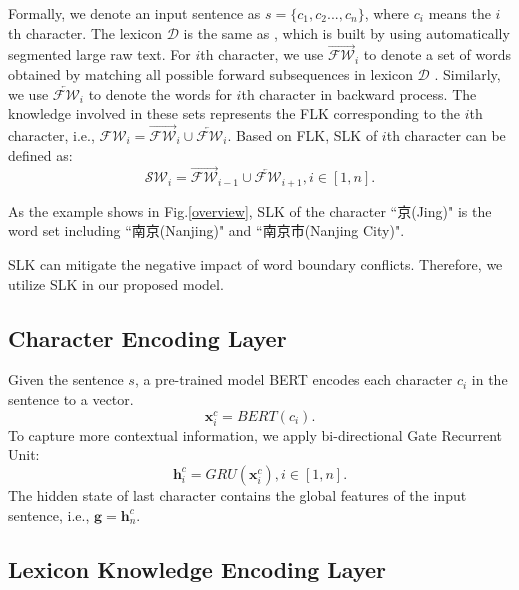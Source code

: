 \documentclass[conference]{IEEEtran}
\begin{document}
Formally, we denote an input sentence as $s = \{ c_{1}, c_{2}..., c_{n} \}$,
where $c_i$ means the $i$th character. The lexicon $\mathcal{D}$ is the same as \cite{zhang2018chinese}, which is built by 
using automatically segmented large raw text.
For $i$th character, we use $\overrightarrow{\mathcal{FW}}_i$ to denote a set of words obtained by 
matching all possible forward subsequences in lexicon $\mathcal{D}$ \cite{liu2019encoding}.  Similarly, we use ${\overleftarrow{\mathcal{FW}}_i}$ to denote the words 
for $i$th character in backward process.
The knowledge involved in these sets represents the FLK corresponding to the $i$th character,
i.e., $\mathcal{FW}_i = {\overrightarrow{\mathcal{FW}}_i} \cup {\overleftarrow{\mathcal{FW}}_i}$.
Based on FLK, SLK of $i$th character can be defined as:
\begin{equation}
    \mathcal{SW}_i = \overrightarrow{\mathcal{FW}}_{i-1}  \cup  \overleftarrow{\mathcal{FW}}_{i+1}
, i \in [1,n].
\end{equation}
\begin{CJK*}{UTF8}{gbsn}
As the example shows in Fig.\ref{overview}, SLK of the character ``京(Jing)" is 
the word set including ``南京(Nanjing)" and ``南京市(Nanjing City)".
\end{CJK*}
SLK can mitigate the negative impact of word boundary conflicts. Therefore, we utilize SLK
in our proposed model. 




\subsection{Character Encoding Layer}
Given the sentence $s$, a pre-trained model BERT \cite{devlin-etal-2019-bert} 
encodes each character $c_i$ in the sentence to a vector. 
\begin{equation}
    \textbf{x}^c_i=BERT(c_i).
\end{equation}
To capture more contextual information, 
we apply bi-directional Gate Recurrent Unit: \begin{equation}
    {\textbf{h}^c_i}={GRU}(\textbf{x}^c_i),i \in [1,n]. 
\end{equation}
The hidden state of last character contains the global features of the input sentence, i.e., $\textbf{g} = \textbf{h}^c_n$.




\subsection{Lexicon Knowledge Encoding Layer}
\end{document}

